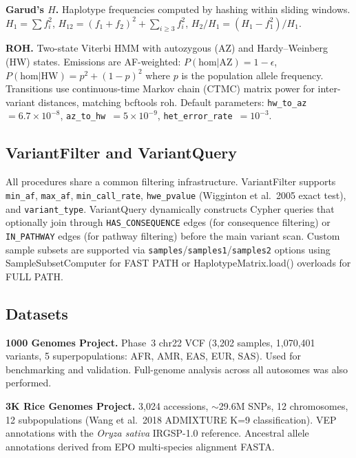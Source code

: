 \textbf{Garud's $H$.}\cite{garud2015recent} Haplotype frequencies computed by hashing within sliding windows. $H_1 = \sum f_i^2$, $H_{12} = (f_1 + f_2)^2 + \sum_{i \geq 3} f_i^2$, $H_2/H_1 = (H_1 - f_1^2)/H_1$.

\textbf{ROH.} Two-state Viterbi HMM\cite{narasimhan2016estimating} with autozygous (AZ) and Hardy--Weinberg (HW) states. Emissions are AF-weighted: $P(\text{hom}|\text{AZ}) = 1 - \epsilon$, $P(\text{hom}|\text{HW}) = p^2 + (1-p)^2$ where $p$ is the population allele frequency. Transitions use continuous-time Markov chain (CTMC) matrix power for inter-variant distances, matching bcftools roh\cite{narasimhan2016bcftools}. Default parameters: \texttt{hw\_to\_az}~$= 6.7 \times 10^{-8}$, \texttt{az\_to\_hw}~$= 5 \times 10^{-9}$, \texttt{het\_error\_rate}~$= 10^{-3}$.

\subsection*{VariantFilter and VariantQuery}

All procedures share a common filtering infrastructure. VariantFilter supports \texttt{min\_af}, \texttt{max\_af}, \texttt{min\_call\_rate}, \texttt{hwe\_pvalue} (Wigginton et al.\ 2005 exact test\cite{wigginton2005note}), and \texttt{variant\_type}. VariantQuery dynamically constructs Cypher queries that optionally join through \texttt{HAS\_CONSEQUENCE} edges (for consequence filtering) or \texttt{IN\_PATHWAY} edges (for pathway filtering) before the main variant scan. Custom sample subsets are supported via \texttt{samples}/\texttt{samples1}/\texttt{samples2} options using SampleSubsetComputer for FAST PATH or HaplotypeMatrix.load() overloads for FULL PATH.

\subsection*{Datasets}

\textbf{1000 Genomes Project.} Phase~3 chr22 VCF (3{,}202 samples, 1{,}070{,}401 variants, 5 superpopulations: AFR, AMR, EAS, EUR, SAS)\cite{1000genomes2015global}. Used for benchmarking and validation. Full-genome analysis across all autosomes was also performed.

\textbf{3K Rice Genomes Project.} 3{,}024 accessions, $\sim$29.6M SNPs, 12 chromosomes, 12 subpopulations (Wang et al.\ 2018 ADMIXTURE K=9 classification)\cite{wang2018genomic}. VEP annotations with the \emph{Oryza sativa} IRGSP-1.0 reference. Ancestral allele annotations derived from EPO multi-species alignment FASTA.

